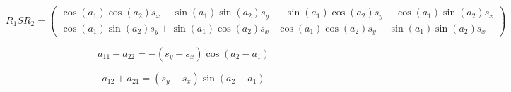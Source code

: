 $$R_1SR_2 = 
\begin{pmatrix}
 \cos{\left( {a_1}\right) } \cos{\left( {a_2}\right) } {s_x}-\sin{\left( {a_1}\right) } \sin{\left( {a_2}\right) } {s_y} & 
-\sin{\left( {a_1}\right) } \cos{\left( {a_2}\right) } {s_y}-\cos{\left( {a_1}\right) } \sin{\left( {a_2}\right) } {s_x}\\
 \cos{\left( {a_1}\right) } \sin{\left( {a_2}\right) } {s_y}+\sin{\left( {a_1}\right) } \cos{\left( {a_2}\right) } {s_x} & 
 \cos{\left( {a_1}\right) } \cos{\left( {a_2}\right) } {s_y}-\sin{\left( {a_1}\right) } \sin{\left( {a_2}\right) } {s_x}
\end{pmatrix}
$$

$$a_{11} - a_{22} = - \left( {s_y}-{s_x}\right) \cos{\left( {a_2}-{a_1}\right) } $$

$$a_{12} + a_{21} = \left( {s_y}-{s_x}\right) \sin{\left( {a_2}-{a_1}\right) } $$